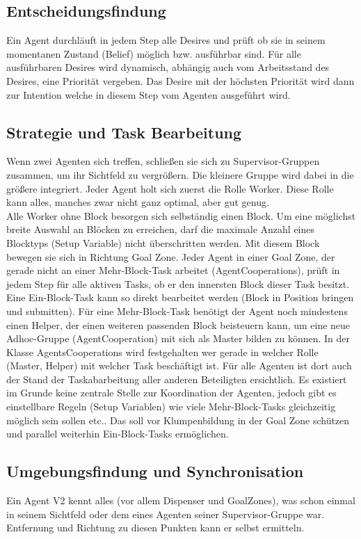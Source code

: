 \documentclass[runningheads]{llncs}
\begin{document}
	\subsection{Entscheidungsfindung}
	Ein Agent durchläuft in jedem Step alle Desires und prüft ob sie in seinem momentanen Zustand (Belief) möglich bzw. ausführbar sind. Für alle ausführbaren Desires wird dynamisch, abhängig auch vom Arbeitsstand des Desires, eine Priorität vergeben. Das Desire mit der höchsten Priorität wird dann zur Intention welche in diesem Step vom Agenten ausgeführt wird.

	\subsection{Strategie und Task Bearbeitung}
	Wenn zwei Agenten sich treffen, schließen sie sich zu Supervisor-Gruppen zusammen, um ihr Sichtfeld zu vergrößern. Die kleinere Gruppe wird dabei in die größere integriert. Jeder Agent holt sich zuerst die Rolle Worker. Diese Rolle kann alles, manches zwar nicht ganz optimal, aber gut genug.\\
	
	Alle Worker ohne Block besorgen sich selbständig einen Block. Um eine möglichst breite Auswahl an Blöcken zu erreichen, darf die maximale Anzahl eines Blocktyps (Setup Variable) nicht überschritten werden. Mit diesem Block bewegen sie sich in Richtung Goal Zone. Jeder Agent in einer Goal Zone, der gerade nicht an einer Mehr-Block-Task arbeitet (AgentCooperations), prüft in jedem Step für alle aktiven Tasks, ob er den innersten Block dieser Task besitzt. Eine Ein-Block-Task kann so direkt bearbeitet werden (Block in Position bringen und submitten). Für eine Mehr-Block-Task benötigt der Agent noch mindestens einen Helper, der einen weiteren passenden Block beisteuern kann, um eine neue Adhoc-Gruppe (AgentCooperation) mit sich als Master bilden zu können. In der Klasse AgentsCooperations wird festgehalten wer gerade in welcher Rolle (Master, Helper) mit welcher Task beschäftigt ist. Für alle Agenten ist dort auch der Stand der Taskabarbeitung aller anderen Beteiligten ersichtlich. Es existiert im Grunde keine zentrale Stelle zur Koordination der Agenten, jedoch gibt es einstellbare Regeln (Setup Variablen) wie viele Mehr-Block-Tasks gleichzeitig möglich sein sollen etc.. Das soll vor Klumpenbildung in der Goal Zone schützen und parallel weiterhin Ein-Block-Tasks ermöglichen.
	
	\subsection{Umgebungsfindung und Synchronisation}
	Ein Agent V2 kennt alles (vor allem Dispenser und GoalZones), was schon einmal in seinem Sichtfeld oder dem eines Agenten seiner Supervisor-Gruppe war. Entfernung und Richtung zu diesen Punkten kann er selbst ermitteln.\\
	
\end{document}
